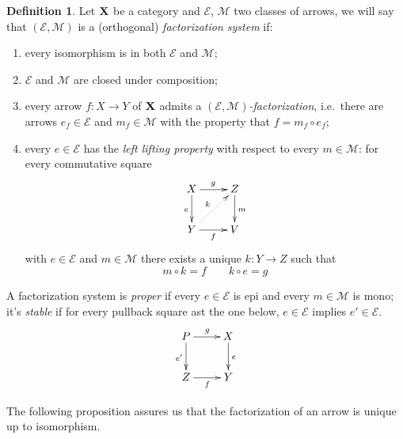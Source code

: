 \documentclass[a4paper]{article}
\def\X{\textbf {\textup{X}}}
\theoremstyle{definition}
\newtheorem{definition}[theorem]{Definition}
\begin{document}
\begin{definition}\label{def:fs}   
	Let $\X$ be a category and $\mathcal{E}$, $\mathcal{M}$ two classes of arrows, we will say that $(\mathcal{E},\mathcal{M})$ is a (orthogonal) \emph{factorization system} if:
	\begin{enumerate}
		\item every isomorphism is in both $\mathcal{E}$ and $\mathcal{M}$;
		\item $\mathcal{E}$ and $\mathcal{M}$ are closed under composition;
		
		\item  every arrow $f\colon X\to Y$ of $\X$ admits a \emph{$(\mathcal{E}, \mathcal{M})$-factorization}, i.e.~there are arrows $e_f\in \mathcal{E}$ and $m_f\in \mathcal{M}$ with the property that $f=m_f\circ e_f$;
		\item every $e\in \mathcal{E}$ has the \emph{left lifting property} with respect to every $m\in \mathcal{M}$: for every commutative square
		\[\xymatrix{X \ar[r]^g \ar[d]_{e}& Z \ar[d]^{m}\\ Y \ar[r]_{f} \ar@{.>}[ur]^{k}& V}\] 	with $e\in \mathcal{E}$ and $m\in \mathcal{M}$ there exists a unique $k\colon Y\rightarrow Z$ such that 
		\[m\circ k=f \qquad k\circ e=g\]
	\end{enumerate}
	
	A factorization system is \emph{proper} if every $e\in \mathcal{E}$ is epi and every $m\in \mathcal{M}$ is mono; it's \emph{stable} if for every pullback square ast the one below,  $e\in \mathcal{E}$ implies $e'\in \mathcal{E}$.
	\[\xymatrix{P\ar[r]^{g} \ar[d]_{e'} & X \ar[d]^{e} \\ Z \ar[r]_{f}  & Y}\]
\end{definition}

The following proposition assures us that the factorization of an arrow is unique up to isomorphism.
\end{document}
